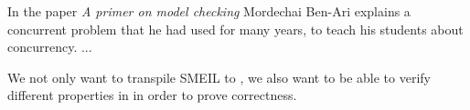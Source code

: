 








In the paper \textit{A primer on model checking}\cite{Ben-ari2010} Mordechai Ben-Ari explains a concurrent problem that he had used for many years, to teach his students about concurrency. ... %



We not only want to transpile SMEIL to \cspm{}, we also want to be able to verify different properties in \cspm{} in order to prove correctness.




%
%
%



